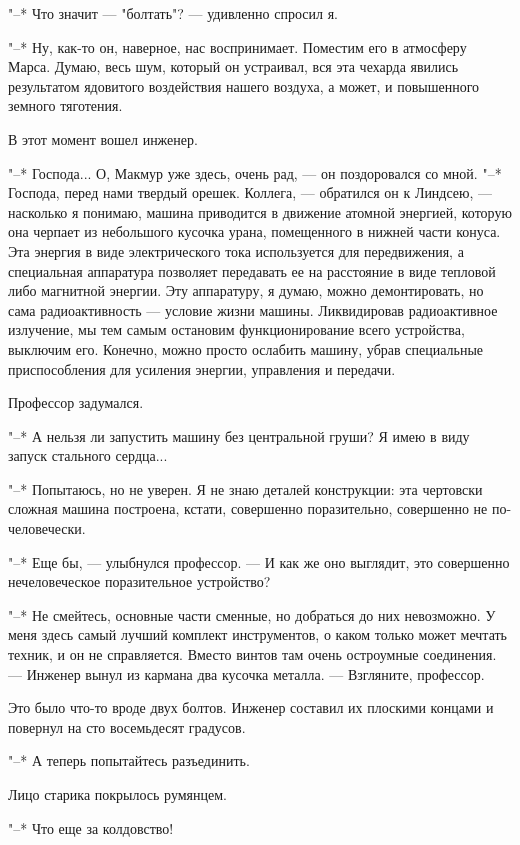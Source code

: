 "--* Что значит --- "болтать"? --- удивленно спросил я.

"--* Ну, как-то он, наверное, нас воспринимает. Поместим его  в  атмосферу
Марса. Думаю, весь шум, который он  устраивал,  вся  эта  чехарда  явились
результатом ядовитого воздействия нашего воздуха, а может,  и  повышенного
земного тяготения.

В этот момент вошел инженер.

"--* Господа... О, Макмур уже здесь, очень рад, --- он поздоровался со мной.
"--* Господа, перед нами твердый орешек. Коллега, --- обратился он к Линдсею, ---
насколько я  понимаю,  машина  приводится  в  движение  атомной  энергией,
которую она черпает из небольшого  кусочка  урана,  помещенного  в  нижней
части конуса. Эта энергия в  виде  электрического  тока  используется  для
передвижения,  а  специальная  аппаратура  позволяет  передавать   ее   на
расстояние в виде тепловой  либо  магнитной  энергии.  Эту  аппаратуру,  я
думаю, можно  демонтировать,  но  сама  радиоактивность  ---  условие  жизни
машины. Ликвидировав  радиоактивное  излучение,  мы  тем  самым  остановим
функционирование всего устройства, выключим  его.  Конечно,  можно  просто
ослабить машину, убрав специальные приспособления  для  усиления  энергии,
управления и передачи.

Профессор задумался.

"--* А нельзя ли запустить машину без центральной груши?  Я  имею  в  виду
запуск стального сердца...

"--* Попытаюсь, но не уверен. Я не знаю деталей конструкции: эта чертовски
сложная машина построена, кстати, совершенно поразительно,  совершенно  не
по-человечески.

"--* Еще бы,  ---  улыбнулся  профессор.  ---  И  как  же  оно  выглядит,  это
совершенно нечеловеческое поразительное устройство?

"--* Не смейтесь, основные части сменные, но добраться до них  невозможно.
У меня здесь самый лучший комплект  инструментов,  о  каком  только  может
мечтать техник, и он не справляется. Вместо винтов  там  очень  остроумные
соединения. --- Инженер вынул из кармана два кусочка металла.  ---  Взгляните,
профессор.

Это было что-то вроде двух болтов. Инженер составил их плоскими концами
и повернул на сто восемьдесят градусов.

"--* А теперь попытайтесь разъединить.

Лицо старика покрылось румянцем.

"--* Что еще за колдовство!

